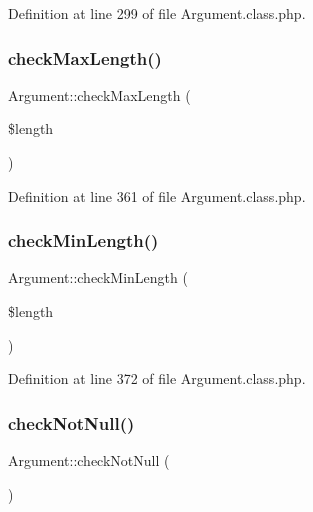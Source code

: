 Definition at line 299 of file Argument.\+class.\+php.

\mbox{\label{classArgument_acc5f170121988acf71c50e5941320112}} 
\subsubsection{\texorpdfstring{check\+Max\+Length()}{checkMaxLength()}}
{\footnotesize\ttfamily Argument\+::check\+Max\+Length (\begin{DoxyParamCaption}\item[{}]{\$length }\end{DoxyParamCaption})}



Definition at line 361 of file Argument.\+class.\+php.

\mbox{\label{classArgument_ac44c716b86dc42d5c0f0e4717a510c74}} 
\subsubsection{\texorpdfstring{check\+Min\+Length()}{checkMinLength()}}
{\footnotesize\ttfamily Argument\+::check\+Min\+Length (\begin{DoxyParamCaption}\item[{}]{\$length }\end{DoxyParamCaption})}



Definition at line 372 of file Argument.\+class.\+php.

\mbox{\label{classArgument_a09edcec0bf4dbfeedec2f7652e44e57d}} 
\subsubsection{\texorpdfstring{check\+Not\+Null()}{checkNotNull()}}
{\footnotesize\ttfamily Argument\+::check\+Not\+Null (\begin{DoxyParamCaption}{ }\end{DoxyParamCaption})}



